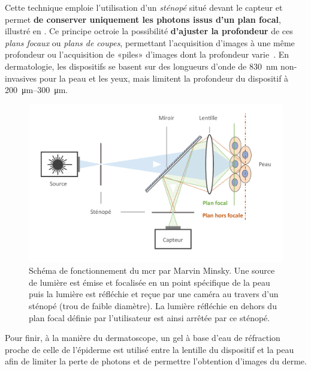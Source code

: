 \addtocounter{footnote}{1}

Cette technique emploie l’utilisation d’un \textit{sténopé} situé devant le capteur et permet \textbf{de conserver uniquement les photons issus d'un plan focal}, illustré en . Ce principe octroie la possibilité \textbf{d'ajuster la profondeur} de ces \textit{plans focaux} ou \textit{plans de coupes}, permettant l'acquisition d'images à une même profondeur ou l'acquisition de «piles» d'images dont la profondeur varie~\cite{Sheppard2019}. En dermatologie, les dispositifs se basent sur des longueurs d’onde de \SI{830}{\nano\metre} non-invasives pour la peau et les yeux, mais limitent la profondeur du dispositif à \SIrange{200}{300}{\micro\metre}.\par

\begin{figure}[H]
\centering
    \includegraphics[width=\linewidth]{contents/chapter_2/resources/scheme_principle_rcm.pdf}
    \caption{Schéma de fonctionnement du \gls{mcr} par Marvin Minsky. Une source de lumière est émise et focalisée en un point spécifique de la peau puis la lumière est réfléchie et reçue par une caméra au travers d'un sténopé (trou de faible diamètre). La lumière réfléchie en dehors du plan focal définie par l'utilisateur est ainsi arrêtée par ce sténopé.}
    \label{fig:scheme_principle_rcm}
\end{figure}\par

Pour finir, à la manière du dermatoscope, un gel à base d’eau de réfraction proche de celle de l’épiderme est utilisé entre la lentille du dispositif et la peau afin de limiter la perte de photons et de permettre l’obtention d’images du derme.\par

